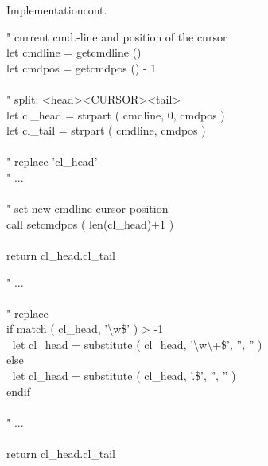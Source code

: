 \documentclass{beamer}
\newenvironment{mycode}[0]
{\ttfamily}
{}
\newcommand{\myind}[1]{\textcolor{white}{#1}}
\newcommand{\mycommt}[1]{\textcolor{comment}{#1}}
\newcommand{\myident}[1]{\textcolor{identifier}{#1}}
\newcommand{\mykeywd}[1]{\textcolor{keyword}{#1}}
\newcommand{\mystring}[1]{\textcolor{string}{#1}}
\begin{document}
\begin{frame}{Implementation}{cont.}

	\begin{overprint}


		\begin{mycode}
			\mycommt{" current cmd.-line and position of the cursor} \\
			\mykeywd{let} cmdline = \myident{getcmdline} () \\
			\mykeywd{let} cmdpos {} = \myident{getcmdpos} () - 1 \\
			\\
			\mycommt{" split: <head><CURSOR><tail>} \\
			\mykeywd{let} cl\_head = \myident{strpart} ( cmdline, 0, cmdpos ) \\
			\mykeywd{let} cl\_tail = \myident{strpart} ( cmdline, cmdpos ) \\
			\\
			\mycommt{" replace 'cl\_head'} \\
			\mycommt{" ...} \\
			\\
			\mycommt{" set new cmdline cursor position} \\
			\mykeywd{call} \myident{setcmdpos} ( len(cl\_head)+1 ) \\
			\\
			\mykeywd{return} cl\_head.cl\_tail \\
		\end{mycode}
		

		\begin{mycode}
			\mycommt{" ...} \\
			\\
			\mycommt{" replace} \\
			\mykeywd{if} match ( cl\_head, \mystring{'\textbackslash{}w\$'} ) > -1 \\
			\myind{..}\mykeywd{let} cl\_head = \myident{substitute}
				( cl\_head, \mystring{'\textbackslash{}w\textbackslash+\$'}, \mystring{''}, \mystring{''} ) \\
			\mykeywd{else} \\
			\myind{..}\mykeywd{let} cl\_head = \myident{substitute}
				( cl\_head, \mystring{'.\$'}, \mystring{''}, \mystring{''} ) \\
			\mykeywd{endif} \\
			\\
			\mycommt{" ...} \\
			\\
			\mykeywd{return} cl\_head.cl\_tail \\
		\end{mycode}
	\end{overprint}
\end{frame}
\end{document}
